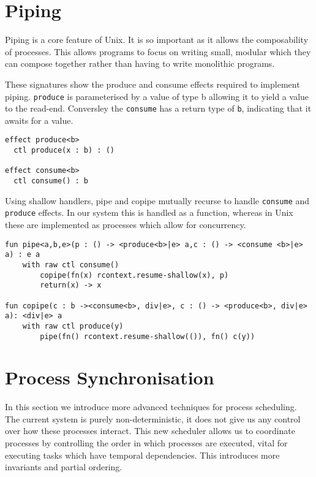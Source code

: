 \documentclass[logo,bsc,singlespacing,parskip]{infthesis}
\begin{document}
\section{Piping}
Piping is a core feature of Unix. It is so important as it allows the composability of processes. This allows programs to focus on writing small, modular which they can compose together rather than having to write monolithic programs.

These signatures show the produce and consume effects required to implement piping. \lstinline{produce} is parameterised by a value of type b allowing it to yield a value to the read-end. Conversley the \lstinline{consume} has a return type of \lstinline{b}, indicating that it awaits for a value.
\begin{lstlisting}
effect produce<b>
  ctl produce(x : b) : ()   

effect consume<b>
  ctl consume() : b         

\end{lstlisting}

Using shallow handlers, pipe and copipe mutually recurse to handle \lstinline{consume} and \lstinline{produce} effects. In our system this is handled as a function, whereas in Unix these are implemented as processes which allow for concurrency.

\begin{lstlisting}
fun pipe<a,b,e>(p : () -> <produce<b>|e> a,c : () -> <consume <b>|e> a) : e a
    with raw ctl consume()
        copipe(fn(x) rcontext.resume-shallow(x), p)
        return(x) -> x

fun copipe(c : b -><consume<b>, div|e>, c : () -> <produce<b>, div|e> a): <div|e> a
    with raw ctl produce(y)
        pipe(fn() rcontext.resume-shallow(()), fn() c(y))
\end{lstlisting}

\section{Process Synchronisation}

In this section we introduce more advanced techniques for process scheduling. The current system is purely non-deterministic, it does not give us any control over how these processes interact. This new scheduler allows us to coordinate processes by controlling the order in which processes are executed, vital for executing tasks which have temporal dependencies. This introduces more invariants and partial ordering.
\end{document}
